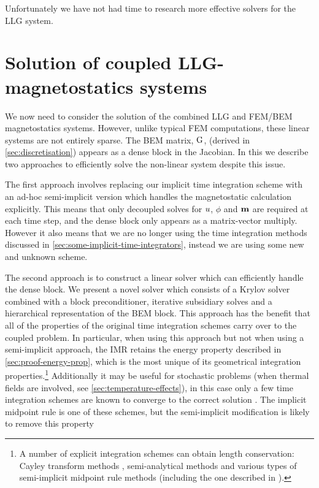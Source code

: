 Unfortunately we have not had time to research more effective solvers for the LLG system.

\section{Solution of coupled LLG-magnetostatics systems}
\label{sec:solut-coupl-syst}

We now need to consider the solution of the combined LLG and FEM/BEM magnetostatics systems.
However, unlike typical FEM computations, these linear systems are not entirely sparse.
The BEM matrix, ${\mathbf{\mathrm{G}}}$, (derived in \cref{sec:discretisation}) appears as a dense block in the Jacobian.
In this  we describe two approaches to efficiently solve the non-linear system despite this issue.

The first approach involves replacing our implicit time integration scheme with an ad-hoc semi-implicit version which handles the magnetostatic calculation explicitly.
This means that only decoupled solves for $u$, $\phi$ and $\boldsymbol{\mathrm{m}}$ are required at each time step, and the dense block only appears as a matrix-vector multiply.
However it also means that we are no longer using the time integration methods discussed in \cref{sec:some-implicit-time-integrators}, instead we are using some new and unknown scheme.

The second approach is to construct a linear solver which can efficiently handle the dense block.
We present a novel solver which consists of a Krylov solver combined with a block preconditioner, iterative subsidiary solves and a hierarchical representation of the BEM block.
This approach has the benefit that all of the properties of the original time integration schemes carry over to the coupled problem.
In particular, when using this approach but not when using a semi-implicit approach, the IMR retains the energy property described in \cref{sec:proof-energy-prop}, which is the most unique of its geometrical integration properties.\footnote{A number of explicit integration schemes can obtain length conservation: Cayley transform methods \cite{Lewis2003}, semi-analytical methods \cite{Wiele2010} and various types of semi-implicit midpoint rule methods \cite{Spargo2003} \cite{Mentink2010} (including the one described in ).}
Additionally it may be useful for stochastic problems (\ie when thermal fields are involved, see \cref{sec:temperature-effects}), in this case only a few time integration schemes are known to converge to the correct solution \cite{DAquino2006}.
The implicit midpoint rule is one of these schemes, but the semi-implicit modification is likely to remove this property


